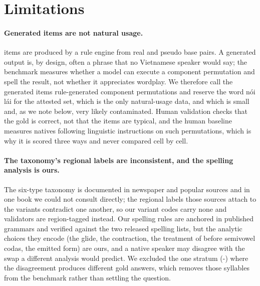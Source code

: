 \section*{Limitations}

\paragraph{Generated items are not natural usage.}
\noilai{} items are produced by a rule engine from real and pseudo base pairs. A generated output is, by design, often a phrase that no Vietnamese speaker would say; the benchmark measures whether a model can execute a component permutation and spell the result, not whether it appreciates wordplay. We therefore call the generated items rule-generated component permutations and reserve the word nói lái for the attested set, which is the only natural-usage data, and which is small and, as we note below, very likely contaminated. Human validation checks that the gold is correct, not that the items are typical, and the human baseline measures natives following linguistic instructions on such permutations, which is why it is scored three ways and never compared cell by cell.

\paragraph{The taxonomy's regional labels are inconsistent, and the spelling analysis is ours.}
The six-type taxonomy is documented in newspaper and popular sources and in one book we could not consult directly; the regional labels those sources attach to the variants contradict one another, so our variant codes carry none and validators are region-tagged instead. Our spelling rules are anchored in published grammars and verified against the two released spelling lists, but the analytic choices they encode (the  glide, the  contraction, the treatment of  before semivowel codas, the emitted  form) are ours, and a native speaker may disagree with the swap a different analysis would predict. We excluded the one stratum (-) where the disagreement produces different gold answers, which removes those syllables from the benchmark rather than settling the question.

